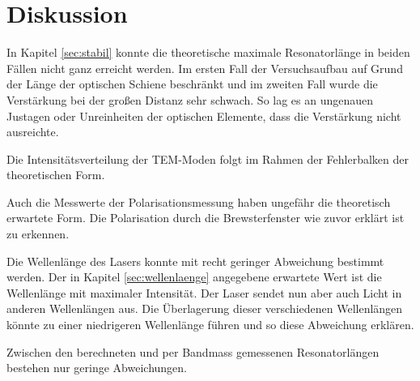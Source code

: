 \section{Diskussion}
\label{sec:Diskussion}

In Kapitel \ref{sec:stabil} konnte die theoretische maximale Resonatorlänge in beiden Fällen nicht ganz erreicht werden. Im ersten Fall der Versuchsaufbau auf Grund der Länge der optischen Schiene beschränkt und im zweiten Fall wurde die Verstärkung bei der großen Distanz sehr schwach. So lag es an ungenauen Justagen oder Unreinheiten der optischen Elemente, dass die Verstärkung nicht ausreichte.

Die Intensitätsverteilung der TEM-Moden folgt im Rahmen der Fehlerbalken der theoretischen Form.

Auch die Messwerte der Polarisationsmessung haben ungefähr die theoretisch erwartete Form. Die Polarisation durch die Brewsterfenster wie zuvor erklärt ist zu erkennen.

Die Wellenlänge des Lasers konnte mit recht geringer Abweichung bestimmt werden. Der in Kapitel \ref{sec:wellenlaenge} angegebene erwartete Wert ist die Wellenlänge mit maximaler Intensität. Der Laser sendet nun aber auch Licht in anderen Wellenlängen aus. Die Überlagerung dieser verschiedenen Wellenlängen könnte zu einer niedrigeren Wellenlänge führen und so diese Abweichung erklären.

Zwischen den berechneten und per Bandmass gemessenen Resonatorlängen bestehen nur geringe Abweichungen.
